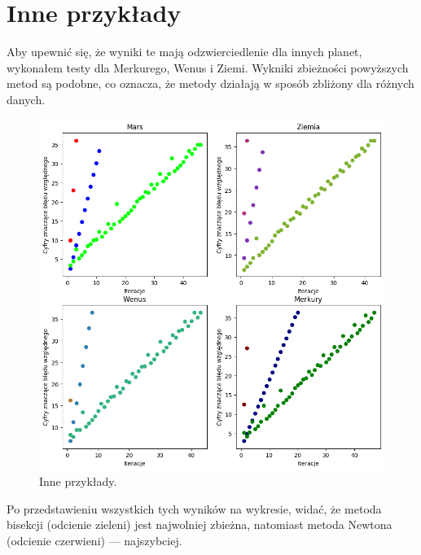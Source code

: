 \documentclass[11pt,wide]{mwart}
\begin{document}
\section{Inne przykłady}
Aby upewnić się, że wyniki te mają odzwierciedlenie dla innych planet, wykonałem testy dla Merkurego, Wenus i Ziemi. Wykniki zbieżności powyższych metod są podobne, co oznacza, że metody działają w sposób zbliżony dla różnych danych.
\begin{figure}[H]
	\begin{center}
	\includegraphics[scale=0.5]{zestawienie_planety}
	\end{center}
	\caption{Inne przykłady.}
\end{figure}
Po przedstawieniu wszystkich tych wyników na wykresie, widać, że metoda bisekcji (odcienie zieleni) jest najwolniej zbieżna, natomiast metoda Newtona (odcienie czerwieni) --- najszybciej.\\
\end{document}

